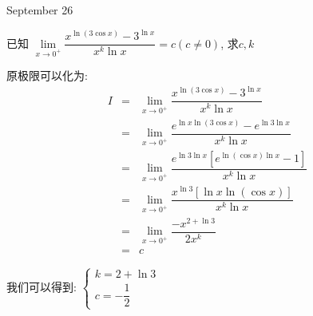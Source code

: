 \textcolor{purplea}{September 26}

\begin{example}[][Exam: 35.4.9]
	已知 $\lim\limits_{x\to 0^{+}}\dfrac{x^{\ln (3\cos x)}-3^{\ln x}}{x^k\ln x}=c(c\neq 0)$, 求$c, k$
\end{example}

\begin{solution}

	原极限可以化为:  
	\begin{eqnarray*}
		I&=&\lim\limits_{x\to 0^{+}}\dfrac{x^{\ln (3\cos x)}-3^{\ln x}}{x^k\ln x}\\
		&=&\lim\limits_{x\to 0^{+}}\dfrac{e^{\ln x\ln (3\cos x)}-e^{\ln3\ln x}}{x^k\ln x}\\
		&=&\lim\limits_{x\to 0^{+}}\dfrac{e^{\ln3\ln x}[e^{\ln(\cos x)\ln x}-1]}{x^k\ln x}\\
		&=&\lim\limits_{x\to 0^{+}}\dfrac{x^{\ln3}[\ln x\ln(\cos x)]}{x^k\ln x}\\
		&=&\lim\limits_{x\to 0^{+}}\dfrac{-x^{2+\ln3}}{2x^k}\\
		&=&c
	\end{eqnarray*}
	
	我们可以得到:  $\left\lbrace
	\begin{array}{l}
		k=2+\ln3\\
		c=-\dfrac{1}{2}
	\end{array}
	\right. $
\end{solution}

